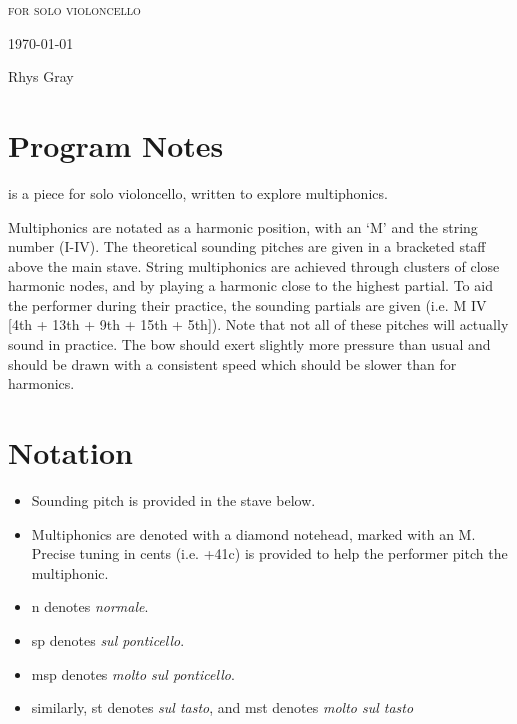 
\invisiblechapter{\celloPiece}

\vspace{3.8cm}

\begin{center}

\textsc{for solo violoncello}

\vspace{2.8cm}

\HRule{0.5pt}

\LARGE \textbf{\uppercase{\celloPiece}}

\HRule{2pt}

\vspace{1.8cm}

\normalsize \today

\vspace{3.8cm}

Rhys Gray

\end{center}
\newpage

\section*{Program Notes}
\celloPiece is a piece for solo violoncello, written to explore multiphonics. 

Multiphonics are notated as a harmonic position, with an `M' and the string number (I-IV). 
The theoretical sounding pitches are given in a bracketed staff above the main stave.
String multiphonics are achieved through clusters of close harmonic nodes, and by playing a harmonic close to the highest partial.
To aid the performer during their practice, the sounding partials are given (i.e. M IV [4th + 13th + 9th + 15th + 5th]).
Note that not all of these pitches will actually sound in practice.
The bow should exert slightly more pressure than usual and should be drawn with a consistent speed which should be slower than for harmonics.

\section*{Notation}
\begin{itemize}

    \item Sounding pitch is provided in the stave below.
    \item Multiphonics are denoted with a diamond notehead, marked with an M. Precise tuning in cents (i.e. +41c) is provided to help the performer pitch the multiphonic.
    \item n denotes \emph{normale}.
    \item sp denotes \emph{sul ponticello}.
    \item msp denotes \emph{molto sul ponticello}.
    \item similarly, st denotes \emph{sul tasto}, and mst denotes \emph{molto sul tasto}
\end{itemize}

\newpage
\label{app:to/do Score}
